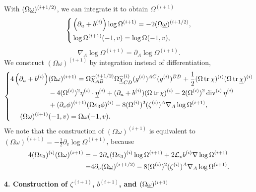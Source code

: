 With $(\Omega\underline\omega)^{(i+1/2)}$, we can integrate it to obtain $\Omega^{(i+1)}$
\begin{equation} 
    \left\{
    \begin{aligned}
        &\left(\partial_u+b^{(i)}\right)\log \Omega^{(i+1)}=-2(\Omega\underline\omega)^{(i+1/2)},\\
        &\log\Omega^{(i+1)}(-1,v)=\log\Omega(-1,v),
    \end{aligned}
    \right.
\end{equation}
\begin{equation}
    \nabla_A\log\Omega^{(i+1)}=\partial_A \log\Omega^{(i+1)}.
\end{equation}
We construct $(\Omega\omega)^{(i+1)}$ by integration instead of differentiation, 
\begin{equation} 
    \left\{\begin{aligned}
        4\left(\partial_u+b^{(i)}\right)&(\Omega\omega)^{(i+1)}=\Omega\widehat\chi^{(i+1/2)}_{AB}\Omega\widehat{\underline\chi}^{(i)}_{CD}(g^{(i)})^{AC}(g^{(i)})^{BD}+\frac{1}{2}(\Omega\operatorname{tr}\chi)^{(i)}(\Omega\operatorname{tr}\underline\chi)^{(i)}\\
        &-4(\Omega^{(i)})^2\eta^{(i)}\cdot\underline\eta^{(i)}+(\partial_u+b^{(i)})(\Omega\operatorname{tr}\chi)^{(i)}-2(\Omega^{(i)})^2\operatorname{div}^{(i)}\eta^{(i)}\\
        &+(\partial_v\phi)^{(i+1)}(\Omega e_3\phi)^{(i)}-8(\Omega^{(i)})^2(\zeta^{(i)})^A\nabla_A\log\Omega^{(i+1)},\\
        (\Omega\omega)^{(i+1)}&(-1,v)=\Omega\omega(-1,v).
    \end{aligned}\right.
\end{equation}
We note that the construction of $(\Omega\omega)^{(i+1)}$ is equivalent to $(\Omega\omega)^{(i+1)}=-\frac{1}{2}\partial_v\log\Omega^{(i+1)}$, because 
\begin{equation}
   \begin{aligned}
     4(\Omega e_3)^{(i)}(\Omega\omega)^{(i+1)}=&-2\partial_v(\Omega e_3)^{(i)}\log\Omega^{(i+1)}+2\mathcal L_v b^{(i)}\nabla\log\Omega^{(i+1)}\\
     =&4\partial_v(\Omega\underline\omega)^{(i+1/2)}-8(\Omega^{(i)})^2(\zeta^{(i)})^A\nabla_A\log\Omega^{(i+1)}.
   \end{aligned}
\end{equation}

\noindent\textbf{4. Construction of $\zeta^{(i+1)}$, $b^{(i+1)}$, and $(\Omega\underline\omega)^{(i+1)}$}

